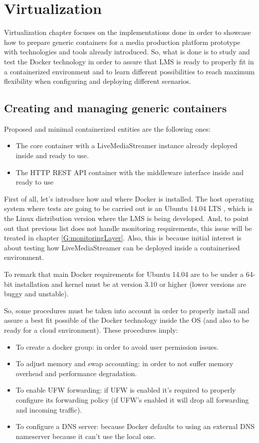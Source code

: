 \chapter{Virtualization}\label{D:virtualization}

Virtualization chapter focuses on the implementations done in order to showcase how to prepare generic containers for a media production platform prototype with technologies and tools already introduced. So, what is done is to study and test the Docker technology in order to assure that LMS is ready to properly fit in a containerized environment and to learn different possibilities to reach maximum flexibility when configuring and deploying different scenarios.

\section{Creating and managing generic containers}
Proposed and minimal containerized entities are the following ones:

\begin{itemize}
\item The core container with a LiveMediaStreamer instance already deployed inside and ready to use.
\item The HTTP REST API container with the middleware interface inside and ready to use
\end{itemize}

First of all, let's introduce how and where Docker is installed. The host operating system where tests are going to be carried out is an Ubuntu 14.04 LTS \cite{ubuntu}, which is the Linux distribution version where the LMS is being developed. And, to point out that previous list does not handle monitoring requirements, this issue will be treated in chapter \ref{G:monitoringLayer}. Also, this is because initial interest is about testing how LiveMediaStreamer can be deployed inside a containerised environment.

To remark that main Docker requirements for Ubuntu 14.04 are to be under a 64-bit installation and kernel must be at version 3.10 or higher (lower versions are buggy and unstable). 

So, some procedures must be taken into account in order to properly install and assure a best fit possible of the Docker technology inside the OS (and also to be ready for a cloud environment). These procedures imply:

\begin{itemize}
\item To create a docker group: in order to avoid user permission issues.
\item To adjust memory and swap accounting: in order to not suffer memory overhead and performance degradation.
\item To enable UFW forwarding: if UFW is enabled it's required to properly configure its forwarding policy (if UFW's enabled it will drop all forwarding and incoming traffic).
\item To configure a DNS server: because Docker defaults to using an external DNS nameserver because it can't use the local one.
\end{itemize}

